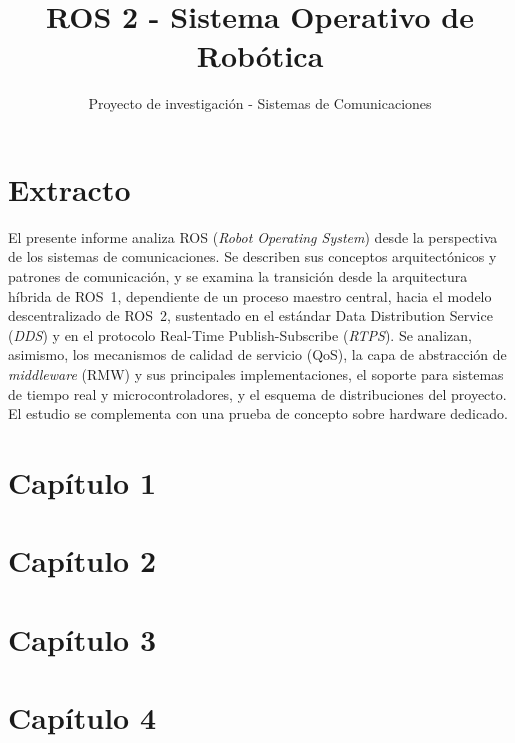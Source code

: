 \documentclass[DOC]{UTNLSE}
\title{ROS 2 - Sistema Operativo de Robótica}
\subtitle{Proyecto de investigación - Sistemas de Comunicaciones}
\begin{document}
\section*{Extracto}
El presente informe analiza ROS (\textit{Robot Operating System}) desde la perspectiva de los sistemas de comunicaciones. Se describen sus conceptos arquitectónicos y patrones de comunicación, y se examina la transición desde la arquitectura híbrida de ROS~1, dependiente de un proceso maestro central, hacia el modelo descentralizado de ROS~2, sustentado en el estándar Data Distribution Service (\textit{DDS}) y en el protocolo Real-Time Publish-Subscribe (\textit{RTPS}). Se analizan, asimismo, los mecanismos de calidad de servicio (QoS), la capa de abstracción de \textit{middleware} (RMW) y sus principales implementaciones, el soporte para sistemas de tiempo real y microcontroladores, y el esquema de distribuciones del proyecto. El estudio se complementa con una prueba de concepto sobre hardware dedicado.

\section{Capítulo 1}


\section{Capítulo 2}


\section{Capítulo 3}


\section{Capítulo 4}


\end{document}
